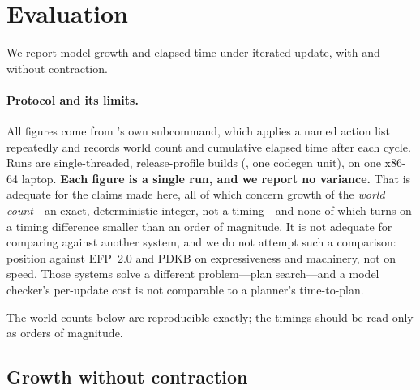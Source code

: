 \documentclass[11pt,a4paper]{article}
\begin{document}
\section{Evaluation}
\label{sec:eval}

We report model growth and elapsed time under iterated update, with and without contraction.

\paragraph{Protocol and its limits.}
All figures come from \delhi's own  subcommand, which applies a named action list
repeatedly and records world count and cumulative elapsed time after each cycle. Runs are
single-threaded, release-profile builds (, one codegen unit), on one x86-64
laptop. \textbf{Each figure is a single run, and we report no variance.} That is adequate for
the claims made here, all of which concern growth of the \emph{world count}---an exact,
deterministic integer, not a timing---and none of which turns on a timing difference smaller
than an order of magnitude. It is not adequate for comparing \delhi{} against another system,
and we do not attempt such a comparison:  position
\mBplus{} against EFP~2.0 \citep{le2018} and PDKB \citep{muise2015} on expressiveness and
machinery, not on speed. Those systems solve a different problem---plan search---and a
model checker's per-update cost is not comparable to a planner's time-to-plan.

The world counts below are reproducible exactly; the timings should be read only as orders of
magnitude.

\subsection{Growth without contraction}
\end{document}
